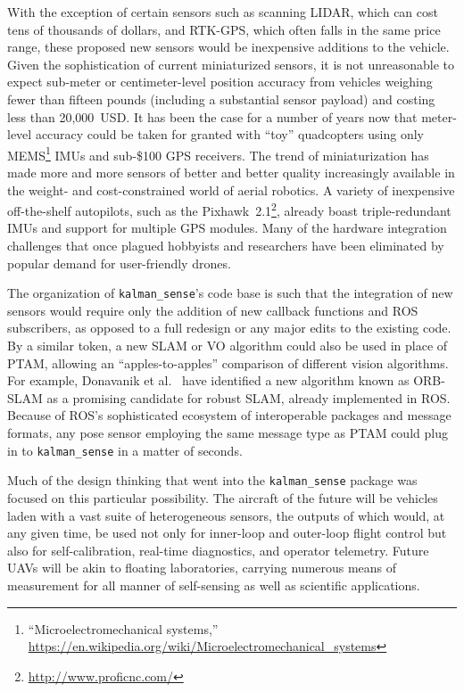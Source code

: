 With the exception of certain sensors such as scanning LIDAR, which can cost tens of thousands of dollars, and RTK-GPS, which often falls in the same price range, these proposed new sensors would be inexpensive additions to the vehicle. Given the sophistication of current miniaturized sensors, it is not unreasonable to expect sub-meter or centimeter-level position accuracy from vehicles weighing fewer than fifteen pounds (including a substantial sensor payload) and costing less than 20,000~USD. It has been the case for a number of years now that meter-level accuracy could be taken for granted with ``toy'' quadcopters using only MEMS\footnote{``Microelectromechanical systems,'' \url{https://en.wikipedia.org/wiki/Microelectromechanical_systems}} IMUs and sub-\$100 GPS receivers. The trend of miniaturization has made more and more sensors of better and better quality increasingly available in the weight- and cost-constrained world of aerial robotics. A variety of inexpensive off-the-shelf autopilots, such as the Pixhawk~2.1\footnote{\url{http://www.proficnc.com/}}, already boast triple-redundant IMUs and support for multiple GPS modules. Many of the hardware integration challenges that once plagued hobbyists and researchers have been eliminated by popular demand for user-friendly drones.

The organization of \texttt{kalman\_sense}'s code base is such that the integration of new sensors would require only the addition of new callback functions and ROS subscribers, as opposed to a full redesign or any major edits to the existing code. By a similar token, a new SLAM or VO algorithm could also be used in place of PTAM, allowing an ``apples-to-apples'' comparison of different vision algorithms. For example, Donavanik et al.\ \cite{Donavanik2016} have identified a new algorithm known as ORB-SLAM \cite{Mur-Artal2015} as a promising candidate for robust SLAM, already implemented in ROS. Because of ROS's sophisticated ecosystem of interoperable packages and message formats, any pose sensor employing the same message type as PTAM could plug in to \texttt{kalman\_sense} in a matter of seconds.

Much of the design thinking that went into the \texttt{kalman\_sense} package was focused on this particular possibility. The aircraft of the future will be vehicles laden with a vast suite of heterogeneous sensors, the outputs of which would, at any given time, be used not only for inner-loop and outer-loop flight control but also for self-calibration, real-time diagnostics, and operator telemetry. Future UAVs will be akin to floating laboratories, carrying numerous means of measurement for all manner of self-sensing as well as scientific applications.

